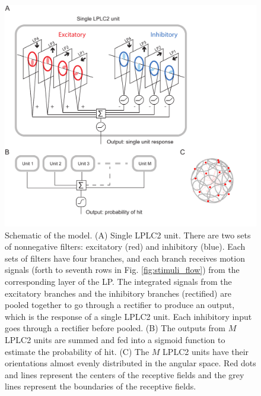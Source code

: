 \documentclass[pdftex,9pt,lineno]{elife}
\begin{document}
\begin{figure}
\end{figure}

\begin{figure}
\includegraphics[width=\linewidth]{figures/model_sketch_paper.pdf}
\caption{Schematic of the model. (A) Single LPLC2 unit. There are two sets of nonnegative filters: excitatory (red) and inhibitory (blue). Each sets of filters have four branches, and each branch receives motion signals (forth to seventh rows in Fig. \ref{fig:stimuli_flow}) from the corresponding layer of the LP. The integrated signals from the excitatory branches and the inhibitory branches (rectified) are pooled together to go through a rectifier to produce an output, which is the response of a single LPLC2 unit. Each inhibitory input goes through a rectifier before pooled. (B) The outputs from $M$ LPLC2 units are summed and fed into a sigmoid function to estimate the probability of hit. (C) The $M$ LPLC2 units have their orientations almost evenly distributed in the angular space. Red dots and lines represent the centers of the receptive fields and the grey lines represent the boundaries of the receptive fields.}

\end{figure}
\end{document}
